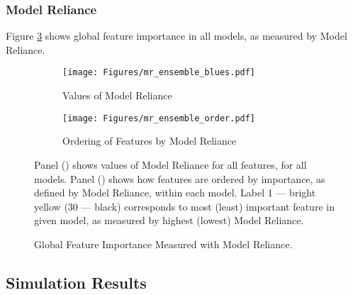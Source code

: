 		\subsubsection{Model Reliance}
		
			Figure \ref{fig:mr_ensemble} shows global feature importance in all models, as measured by Model Reliance.
			
			\begin{figure}	
				\centering		
				\begin{subfigure}[t]{\textwidth}
					\texttt{[image: Figures/mr\_ensemble\_blues.pdf]}
					\caption{Values of Model Reliance}
					\label{fig:mr_ensemble_blues}
				\end{subfigure}
				
				\begin{subfigure}[t]{\textwidth}
					\centering
					\texttt{[image: Figures/mr\_ensemble\_order.pdf]}
					\caption{Ordering of Features by Model Reliance}
					\label{fig:mr_ensemble_order}
				\end{subfigure}
				\caption{Global Feature Importance Measured with Model Reliance.}
				\medskip
				\small
				Panel () shows values of Model Reliance for all features, for all models.  Panel () shows how features are ordered by importance, as defined by Model Reliance, within each model. Label 1 --- bright yellow (30 --- black) corresponds to most (least) important feature in given model, as measured by highest (lowest) Model Reliance.  
				\label{fig:mr_ensemble}
			\end{figure}
		
	\subsection{Simulation Results}
	
	
	